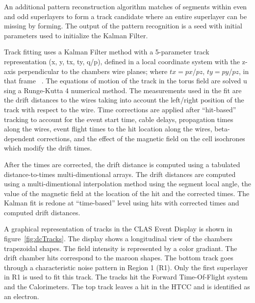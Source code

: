 \documentclass{elsart}
\begin{document}
An additional  pattern reconstruction algorithm  matches of segments within even and odd superlayers to form
a track candidate where an entire superlayer can be missing by forming. The output of the pattern recognition
is a seed with initial parameters used to initialize the Kalman Filter.

Track fitting uses a Kalman Filter method with a 5-parameter track representation (x, y, tx, ty, q/p), defined
in a local coordinate system with the z-axis perpendicular to the chambers wire planes; where $tx=px$/$pz$,
$ty=py$/$pz$, in that frame~\cite{spiri} .  The equations of motion of the track in the torus field are solved u
sing a Runge-Kutta 4 numerical method.  The measurements used in the fit are the drift distances to the wires
taking into account the left/right position of the track with respect to the wire. Time corrections are applied
after ``hit-based'' tracking to account for the event start time, cable delays, propagation times along the
wires, event flight times to the hit location along the wires, beta-dependent corrections, and the effect of
the magnetic field on the cell isochrones which modify the drift times.  

After the times are corrected, the drift distance is computed using a tabulated distance-to-times
multi-dimentional arrays.  The drift distances are computed using a multi-dimentional interpolation method
using the segment local angle, the value of the magnetic field at the location of the hit and the corrected
times.  The Kalman fit is redone at ``time-based'' level using hits with corrected times and computed drift
distances. 

A graphical representation of tracks in the CLAS Event Display is shown in figure~\ref{fig:dcTracks}.  The
display shows a longitudinal view of the chambers trapezoidal shapes. The field intensity is represented by a
color gradiant. The drift chamber hits correspond to the maroon shapes.  The bottom track goes through a
characteristic noise pattern in Region 1 (R1). Only the first superlayer in R1 is used to fit this track.  The
tracks hit the Forward Time-Of-Flight system and the Calorimeters.  The top track leaves a hit in the HTCC
and is identified as an electron. 
\end{document}

